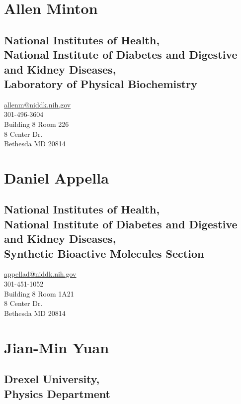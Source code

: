 \documentclass[]{scrartcl}
\begin{document}
\begin{cleanCV}

\drawcvheadertitle{2cm}

\vspace{1em}

\section{Allen Minton}
\subsection{National Institutes of Health,\\ 
National Institute of Diabetes and Digestive and Kidney Diseases,\\
Laboratory of Physical Biochemistry}

\url{allenm@niddk.nih.gov}\\
301-496-3604\\
Building 8 Room 226\\
8 Center Dr.\\
Bethesda MD 20814\\

\section{Daniel Appella}
\subsection{National Institutes of Health,\\
National Institute of Diabetes and Digestive and Kidney Diseases,\\
Synthetic Bioactive Molecules Section}

\url{appellad@niddk.nih.gov}\\
301-451-1052\\
Building 8 Room 1A21\\
8 Center Dr.\\
Bethesda MD 20814\\

\section{Jian-Min Yuan}
\subsection{Drexel University,\\
Physics Department}


\end{cleanCV}
\end{document}
